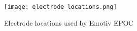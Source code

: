 \begin{figure}[h]
	\centering
	\texttt{[image: electrode\_locations.png]}
	\caption{Electrode locations used by Emotiv EPOC\protect\footnotemark}
	\label{fig:electrode_locations}
\end{figure}
